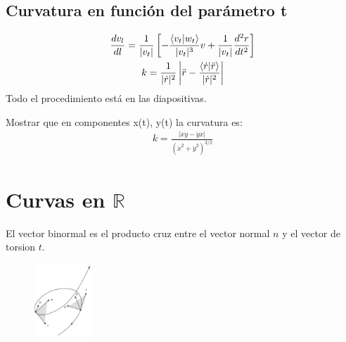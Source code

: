 \documentclass{article}
\newcommand{\caja}[3]{%
  \begin{tcolorbox}[colback=#1!5!white,colframe=#1!25!black,title=#2]
    #3
  \end{tcolorbox}%
}
\begin{document}
\subsection{Curvatura en función del parámetro t}
\caja{green}{Curvatura en funcion de t }{
  \begin{gather}
    \frac{d v_l  }{d l}=\frac{1}{|v_t| }\left[ -\frac{\bra{v_t }\ket{w_t } }{|v_t|^3 }v + \frac{1}{|v_t|}\frac{d ^2 r  }{d t^2 }     \right]   \\
    k = \frac{1}{|\dot r|^2 }\left|\ddot r - \frac{\bra{\dot r }\ket{\ddot r } }{|\dot r|^2}\right| 
  \end{gather}
  Todo el procedimiento está en las diapositivas.
}
\caja{black}{Ejercicio}{
  Mostrar que en componentes x(t), y(t) la curvatura es:
  \begin{gather}
     k = \frac{|\ddot x \dot y - \ddot y \dot x |}{(\dot x^2 + \dot y^2)^ {3/2}} 
  \end{gather}
}

\section{Curvas en $ \mathbb{R}  $ } %
El vector binormal es el producto cruz entre el vector normal $ n  $ y el vector de torsion $t$.
\begin{figure}[H]
  \begin{center}
    \includegraphics[width=0.2\textwidth]{vector_binormal.png}
  \end{center}
\end{figure}
\end{document}
